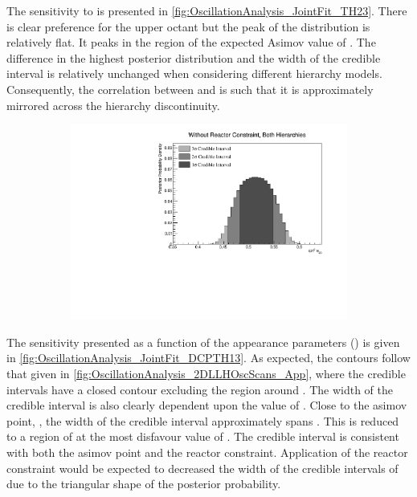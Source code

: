 The sensitivity to \sinsqatm is presented in \autoref{fig:OscillationAnalysis_JointFit_TH23}. There is clear preference for the upper octant but the peak of the distribution is relatively flat. It peaks in the region of the expected Asimov value of . The difference in the highest posterior distribution and the width of the credible interval is relatively unchanged when considering different hierarchy models. Consequently, the correlation between \delmsqatm and \sinsqatm is such that it is approximately mirrored across the hierarchy discontinuity.

\begin{figure}[h]
  \begin{subfigure}[t]{1.0\textwidth}
    \includegraphics[width=\textwidth, trim={0mm 0mm 0mm 0mm}, clip,page=1]{Figures/OA/JointFit/Contours_1D_th23_BH_1_woRC_UnSmeared_CredibleInterval.pdf}
  \end{subfigure}
  \caption{}
  \label{fig:OscillationAnalysis_JointFit_TH23}
\end{figure}

The sensitivity presented as a function of the appearance parameters () is given in \autoref{fig:OscillationAnalysis_JointFit_DCPTH13}. As expected, the contours follow that given in \autoref{fig:OscillationAnalysis_2DLLHOscScans_App}, where the \quickmath{2\sigma} credible intervals have a closed contour excluding the region around . The width of the \quickmath{3\sigma} credible interval is also clearly dependent upon the value of . Close to the asimov point, , the width of the \quickmath{3\sigma} credible interval approximately spans . This is reduced to a region of  at the most disfavour value of . The \quickmath{1\sigma} credible interval is consistent with both the asimov point and the reactor constraint. Application of the reactor constraint would be expected to decreased the  width of the \quickmath{1\sigma} credible intervals of \dcp due to the triangular shape of the posterior probability. 

